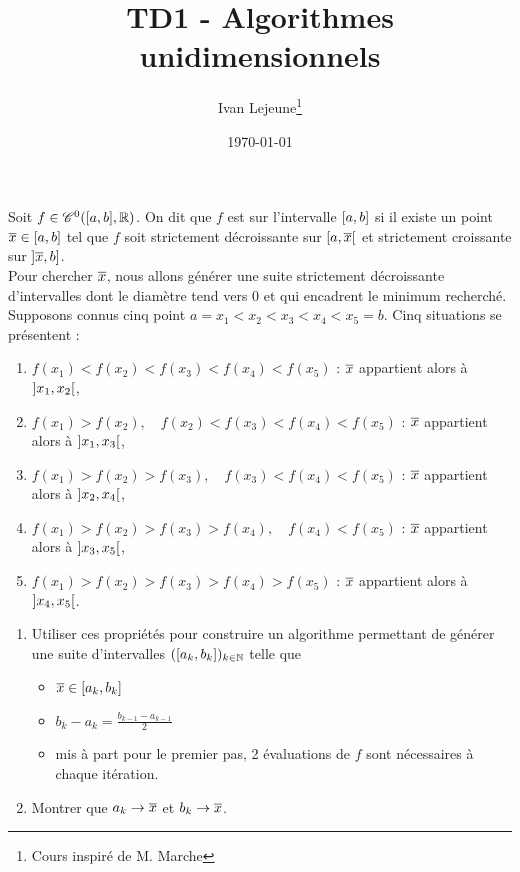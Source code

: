 \documentclass[french,a4paper,10pt]{article}
\title{\color{astral} \sffamily \bfseries TD1 - Algorithmes unidimensionnels}
\author{Ivan Lejeune\thanks{Cours inspiré de M. Marche}}
\date{\today}
\begin{document}
	\maketitle
	\begin{td-exo}
		Soit $f\in\mathscr{C}^0(\mathopen{[}a,b\mathclose{]},\mathbb{R})$. On dit que $f$ est  sur l'intervalle $\mathopen{[}a,b\mathclose{]}$ si il existe un point $\overline{x}\in\mathopen{[}a,b\mathclose{]}$ tel que $f$ soit strictement décroissante sur $\mathopen{[}a,\overline{x}\mathclose{[}$ et strictement croissante sur $\mathopen{]}\overline{x}, b\mathclose{]}$.\\
		
		Pour chercher $\overline{x}$, nous allons générer une suite strictement décroissante d'intervalles dont le diamètre tend vers 0 et qui encadrent le minimum recherché.\\
		
		Supposons connus cinq point $a=x_1<x_2<x_3<x_4<x_5=b$. Cinq situations se présentent :
			\begin{enumerate}[label=$(\roman*)$]
				\item $f(x_1)<f(x_2)<f(x_3)<f(x_4)<f(x_5)$ : $\overline{x}$ appartient alors à $\mathopen{]}x_1,x_2\mathclose{[}$,
				
				\item $f(x_1)>f(x_2),\quad f(x_2)<f(x_3)<f(x_4)<f(x_5)$ : $\overline{x}$ appartient alors à $\mathopen{]}x_1,x_3\mathclose{[}$,
				
				\item $f(x_1)>f(x_2)>f(x_3),\quad f(x_3)<f(x_4)<f(x_5)$ : $\overline{x}$ appartient alors à $\mathopen{]}x_2,x_4\mathclose{[}$,
				
				\item $f(x_1)>f(x_2)>f(x_3)>f(x_4),\quad f(x_4)<f(x_5)$ : $\overline{x}$ appartient alors à $\mathopen{]}x_3,x_5\mathclose{[}$,
				
				\item $f(x_1)>f(x_2)>f(x_3)>f(x_4)>f(x_5)$ : $\overline{x}$ appartient alors à $\mathopen{]}x_4,x_5\mathclose{[}$.
			\end{enumerate}
		\begin{enumerate}
			\item Utiliser ces propriétés pour construire un algorithme permettant de générer une suite d'intervalles $(\mathopen{[}a_k,b_k\mathclose{]})_{k\in\mathbb{N}}$ telle que
				\begin{itemize}
					\item $\overline{x}\in\mathopen{[}a_k,b_k\mathclose{]}$
					
					\item $b_k-a_k=\frac{b_{k-1}-a_{k-1}}2$
					
					\item mis à part pour le premier pas, 2 évaluations de $f$ sont nécessaires à chaque itération.
				\end{itemize}
			\item Montrer que $a_k\to\overline{x}$ et $b_k\to \overline{x}$.
		\end{enumerate}
	\end{td-exo}
	
\end{document}
